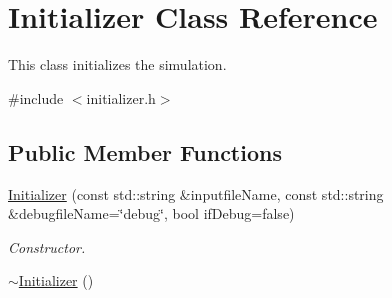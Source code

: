 \hypertarget{classInitializer}{\section{Initializer Class Reference}
\label{classInitializer}
}


This class initializes the simulation.  




{\ttfamily \#include $<$initializer.\-h$>$}

\subsection*{Public Member Functions}
\begin{DoxyCompactItemize}
\item 
\hyperlink{classInitializer_aa49080b548dcd5ef06d2fb5dedce46c5}{Initializer} (const std\-::string \&inputfile\-Name, const std\-::string \&debugfile\-Name=\char`\"{}debug\char`\"{}, bool if\-Debug=false)
\begin{DoxyCompactList}\small\item\em Constructor. \end{DoxyCompactList}\item 
\hypertarget{classInitializer_add39a548b1e5405e938e786f069191e1}{\hyperlink{classInitializer_add39a548b1e5405e938e786f069191e1}{$\sim$\-Initializer} ()}\label{classInitializer_add39a548b1e5405e938e786f069191e1}


\end{DoxyCompactItemize}
